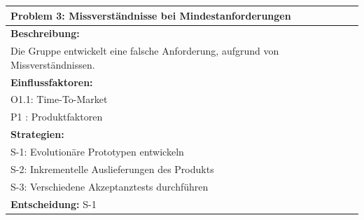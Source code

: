 \documentclass[fontsize=12pt,paper=a4,twoside]{scrartcl}
\begin{document}
\begin{longtable}{|p{15cm}|}
\hline
Problem 3: Missverständnisse bei Mindestanforderungen                                                                           
\\ \hline                                                                                                                                                                                                                                                                                                                                                                                                                                                                                                                                                        
\textbf{Beschreibung:} \\
Die Gruppe entwickelt eine falsche Anforderung, aufgrund von Missverständnissen.
\\ \hline
\textbf{Einflussfaktoren:} \\
O1.1: Time-To-Market \\
P1   : Produktfaktoren
\\ \hline
\textbf{Strategien:} \\
S-1: Evolutionäre Prototypen entwickeln \\
S-2: Inkrementelle Auslieferungen des Produkts \\
S-3: Verschiedene Akzeptanztests durchführen
 \\ \hline
 \textbf{Entscheidung:} S-1
\\ \hline
\end{longtable}
\end{document}
